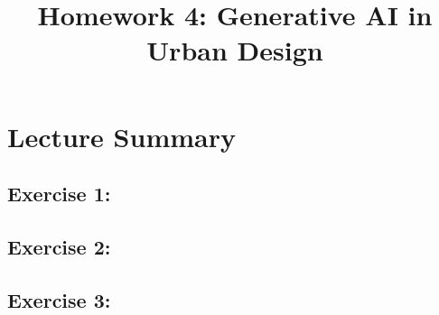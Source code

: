 \documentclass[11pt]{article}
\title{Homework 4: Generative AI in Urban Design}
\begin{document}
\maketitle

\section*{Lecture Summary}


\subsection*{Exercise 1: }


\subsection*{Exercise 2: }


\subsection*{Exercise 3: }
\end{document}
